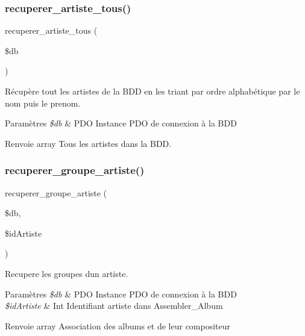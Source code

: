 \subsubsection{\texorpdfstring{recuperer\+\_\+artiste\+\_\+tous()}{recuperer\_artiste\_tous()}}
{\footnotesize\ttfamily recuperer\+\_\+artiste\+\_\+tous (\begin{DoxyParamCaption}\item[{}]{\$db }\end{DoxyParamCaption})}



Récupère tout les artistes de la B\+DD en les triant par ordre alphabétique par le nom puis le prenom. 


\begin{DoxyParams}{Paramètres}
{\em \$db} & P\+DO Instance P\+DO de connexion à la B\+DD \\
\hline
\end{DoxyParams}
\begin{DoxyReturn}{Renvoie}
array Tous les artistes dans la B\+DD. 
\end{DoxyReturn}
\mbox{\label{fonctionArtiste_8php_a3316e178c4a16e77137d06da4f3678a6}} 
\subsubsection{\texorpdfstring{recuperer\+\_\+groupe\+\_\+artiste()}{recuperer\_groupe\_artiste()}}
{\footnotesize\ttfamily recuperer\+\_\+groupe\+\_\+artiste (\begin{DoxyParamCaption}\item[{}]{\$db,  }\item[{}]{\$id\+Artiste }\end{DoxyParamCaption})}



Recupere les groupes d\textquotesingle{}un artiste. 


\begin{DoxyParams}{Paramètres}
{\em \$db} & P\+DO Instance P\+DO de connexion à la B\+DD \\
\hline
{\em \$id\+Artiste} & Int Identifiant artiste dans Assembler\+\_\+\+Album \\
\hline
\end{DoxyParams}
\begin{DoxyReturn}{Renvoie}
array Association des albums et de leur compositeur 
\end{DoxyReturn}
\mbox{\label{fonctionArtiste_8php_a832fa57d647e7f45e0b04178dc0fd91c}} 
